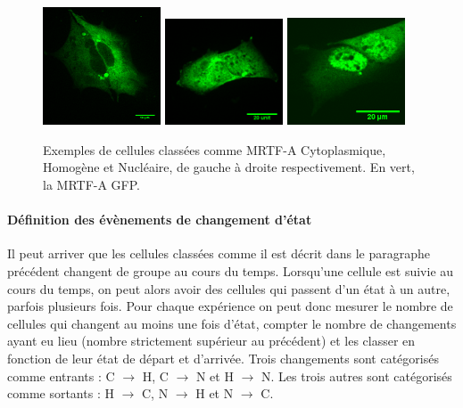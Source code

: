  \begin{figure}
  \includegraphics[width=3.5cm]{Figures/Exemple_C_GFP.png} 
 \includegraphics[width=3.5cm]{Figures/Exemple_H_GFP.png} 
 \includegraphics[width=3.5cm]{Figures/Exemple_N_2_GFP.png} 
 \caption{Exemples de cellules classées comme MRTF-A Cytoplasmique, Homogène et Nucléaire, de gauche à droite respectivement. En vert, la MRTF-A GFP.\label{Exemples_CHN}}

 \end{figure}
 
 \paragraph{Définition des évènements de changement d'état}
 
 Il peut arriver que les cellules classées comme il est décrit dans le paragraphe précédent changent de groupe au cours du temps. 
 Lorsqu'une cellule est suivie au cours du temps, on peut alors avoir des cellules qui passent d'un état à un autre, parfois plusieurs fois. 
 Pour chaque expérience on peut donc mesurer le nombre de cellules qui changent au moins une fois d'état, compter le nombre de changements ayant eu lieu (nombre strictement supérieur au précédent) et les classer en fonction de leur état de départ et d'arrivée. 
 Trois changements sont catégorisés comme \og entrants \fg : C $\rightarrow$ H, C $\rightarrow$ N et H $\rightarrow$ N. 
 Les trois autres sont catégorisés comme \og sortants \fg  : H $\rightarrow$ C, N $\rightarrow$ H et N $\rightarrow$ C. 
 
